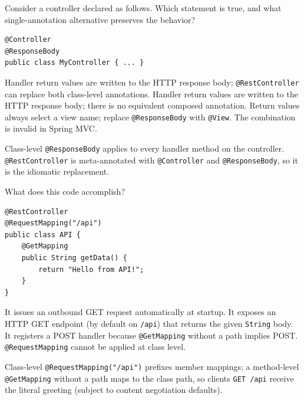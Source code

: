 \question[4]
Consider a controller declared as follows. Which statement is true, and what single-annotation alternative preserves the behavior?
\begin{lstlisting}[style=java]
@Controller
@ResponseBody
public class MyController { ... }
\end{lstlisting}
\begin{choices}
  \CorrectChoice Handler return values are written to the HTTP response body; \texttt{@RestController} can replace both class-level annotations.
  \choice Handler return values are written to the HTTP response body; there is no equivalent composed annotation.
  \choice Return values always select a view name; replace \texttt{@ResponseBody} with \texttt{@View}.
  \choice The combination is invalid in Spring MVC.
\end{choices}
\begin{solution}
  Class-level \texttt{@ResponseBody} applies to every handler method on the controller. \texttt{@RestController} is meta-annotated with \texttt{@Controller} and \texttt{@ResponseBody}, so it is the idiomatic replacement.
\end{solution}

\question[4]
What does this code accomplish?
\begin{lstlisting}[style=java]
@RestController
@RequestMapping("/api")
public class API {
    @GetMapping
    public String getData() {
        return "Hello from API!";
    }
}
\end{lstlisting}
\begin{choices}
  \choice It issues an outbound GET request automatically at startup.
  \CorrectChoice It exposes an HTTP GET endpoint (by default on \texttt{/api}) that returns the given \texttt{String} body.
  \choice It registers a POST handler because \texttt{@GetMapping} without a path implies POST.
  \choice \texttt{@RequestMapping} cannot be applied at class level.
\end{choices}
\begin{solution}
  Class-level \texttt{@RequestMapping("/api")} prefixes member mappings; a method-level \texttt{@GetMapping} without a path maps to the class path, so clients \texttt{GET /api} receive the literal greeting (subject to content negotiation defaults).
\end{solution}

